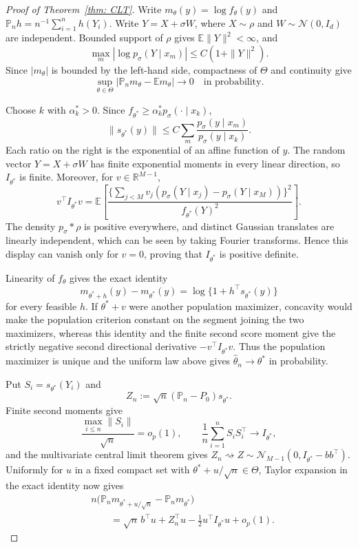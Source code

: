 \documentclass[12pt]{iopart}
\theoremstyle{remark}
\begin{document}
\begin{proof}[Proof of Theorem~\ref{thm: CLT}]
Write $m_\theta(y)=\log f_\theta(y)$ and
$\mathbb P_nh=n^{-1}\sum_{i=1}^nh(Y_i)$. Write
$Y=X+\sigma W$, where $X\sim\rho$ and $W\sim\mathcal N(0,I_d)$ are
independent. Bounded support of $\rho$ gives $\mathbb E\|Y\|^2<\infty$,
and
\[
\max_m|\log p_\sigma(Y\mid x_m)|\leq C(1+\|Y\|^2).
\]
Since $|m_\theta|$ is bounded by the left-hand side, compactness of
$\Theta$ and continuity give
\[
\sup_{\theta\in\Theta}
|\mathbb P_nm_\theta-\mathbb E m_\theta|\longrightarrow0
\quad\text{in probability}.
\]

Choose $k$ with $\alpha_k^*>0$. Since
$f_{\theta^*}\geq\alpha_k^*p_\sigma(\cdot\mid x_k)$,
\[
\|s_{\theta^*}(y)\|
\leq C\sum_m\frac{p_\sigma(y\mid x_m)}{p_\sigma(y\mid x_k)}.
\]
Each ratio on the right is the exponential of an affine function of $y$.
The random vector $Y=X+\sigma W$ has finite exponential moments in every
linear direction, so $I_{\theta^*}$ is finite. Moreover, for
$v\in\mathbb R^{M-1}$,
\[
v^\top I_{\theta^*}v
=\mathbb E\left[
\frac{\{\sum_{j<M}v_j(p_\sigma(Y\mid x_j)-p_\sigma(Y\mid x_M))\}^2}
{f_{\theta^*}(Y)^2}
\right].
\]
The density $p_\sigma*\rho$ is positive everywhere, and distinct Gaussian
translates are linearly independent, which can be seen  by taking
Fourier transforms. Hence this display can vanish only for $v=0$, proving
that $I_{\theta^*}$ is positive definite.

Linearity of $f_\theta$ gives the exact identity
\[
m_{\theta^*+h}(y)-m_{\theta^*}(y)
=\log\{1+h^\top s_{\theta^*}(y)\}
\]
for every feasible $h$.
If $\theta^*+v$ were another population maximizer, concavity would make the
population criterion constant on the segment joining the two maximizers,
whereas this identity and the finite second score moment give the strictly
negative second directional derivative $-v^\top I_{\theta^*}v$. Thus the population
maximizer is unique and the uniform law above gives
$\hat\theta_n\to\theta^*$ in probability.

Put $S_i=s_{\theta^*}(Y_i)$ and
\[
Z_n:=\sqrt n(\mathbb P_n-P_0)s_{\theta^*}.
\]
Finite second moments give
\[
\frac{\max_{i\leq n}\|S_i\|}{\sqrt n}=o_p(1),
\qquad
\frac1n\sum_{i=1}^nS_iS_i^\top\longrightarrow I_{\theta^*},
\]
and the multivariate central limit theorem gives
$Z_n\rightsquigarrow Z\sim
\mathcal N_{M-1}(0,I_{\theta^*}-bb^\top)$. Uniformly for $u$ in a fixed
compact set with $\theta^*+u/\sqrt n\in\Theta$, Taylor expansion in the
exact identity now gives
\begin{align*}
&n\big(\mathbb P_nm_{\theta^*+u/\sqrt n}
-\mathbb P_nm_{\theta^*}\big)\\
&\qquad=\sqrt n\,b^\top u+Z_n^\top u
-\frac12u^\top I_{\theta^*}u+o_p(1).
\end{align*}


\end{proof}
\end{document}
